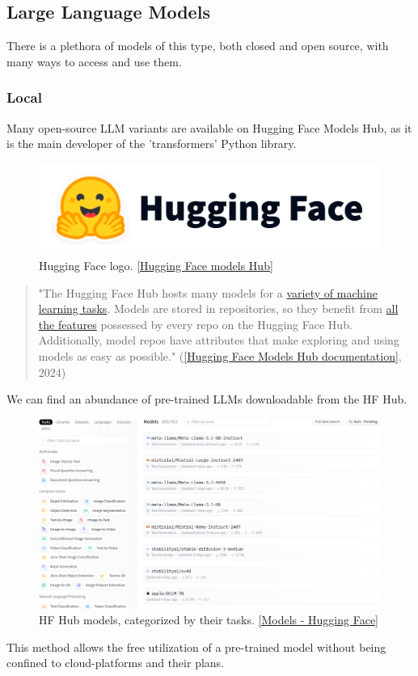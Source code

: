 \subsection{Large Language Models}
There is a plethora of models of this type, both closed and open source, with many ways to access and use them.
\subsubsection{Local}
Many open-source LLM variants are available on Hugging Face Models Hub, as it is the main developer of the 'transformers' Python library.
\begin{figure}[H]
    \centering
    \includegraphics[width=0.4\linewidth]{./figures/hf-logo.png}
    \caption{Hugging Face logo. \href{https://huggingface.co/models}{[Hugging Face models Hub]}}
\end{figure}
\begin{quote}
    "The Hugging Face Hub hosts many models for a \href{https://huggingface.co/tasks}{variety of machine learning tasks}. Models are stored in repositories, so they benefit from \href{https://huggingface.co/docs/hub/repositories}{all the features} possessed by every repo on the Hugging Face Hub. Additionally, model repos have attributes that make exploring and using models as easy as possible."  (\href{https://huggingface.co/docs/hub/models}{[Hugging Face Models Hub documentation]}, 2024)
\end{quote}
We can find an abundance of pre-trained LLMs downloadable from the HF Hub.
\begin{figure}[H]
    \centering
    \includegraphics[width=.85\linewidth]{./figures/hf-models.png}
    \caption{HF Hub models, categorized by their tasks. \href{https://huggingface.co/models}{[Models - Hugging Face]}}
\end{figure}
This method allows the free utilization of a pre-trained model without being confined to cloud-platforms and their plans.
